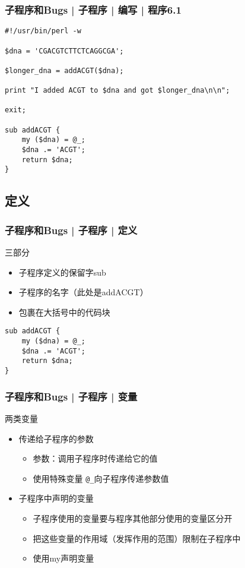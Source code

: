 \begin{frame}[fragile]
  \frametitle{子程序和Bugs | 子程序 | 编写 | \alert{程序6.1}}
\begin{lstlisting}
#!/usr/bin/perl -w

$dna = 'CGACGTCTTCTCAGGCGA';

$longer_dna = addACGT($dna);

print "I added ACGT to $dna and got $longer_dna\n\n";

exit;

sub addACGT {
    my ($dna) = @_;
    $dna .= 'ACGT';
    return $dna;
}
\end{lstlisting}
\end{frame}

\subsection{定义}
\begin{frame}[fragile]
  \frametitle{子程序和Bugs | 子程序 | \alert{定义}}
  \begin{block}{三部分}
    \begin{itemize}
      \item 子程序定义的保留字sub
      \item 子程序的名字（此处是addACGT）
      \item 包裹在大括号中的代码块
    \end{itemize}
  \end{block}
\begin{lstlisting}
sub addACGT {
    my ($dna) = @_;
    $dna .= 'ACGT';
    return $dna;
}
\end{lstlisting}
\end{frame}

\begin{frame}[fragile]
  \frametitle{子程序和Bugs | 子程序 | \alert{变量}}
  \begin{block}{两类变量}
    \begin{itemize}
      \item 传递给子程序的参数
	\begin{itemize}
	  \item 参数：调用子程序时传递给它的值
	  \item 使用特殊变量 \verb|@_|向子程序传递参数值
	\end{itemize}
      \item 子程序中声明的变量
	\begin{itemize}
	  \item 子程序使用的变量要与程序其他部分使用的变量区分开
	  \item 把这些变量的作用域（发挥作用的范围）限制在子程序中
	  \item 使用my声明变量
	\end{itemize}
    \end{itemize}
  \end{block}
\end{frame}


